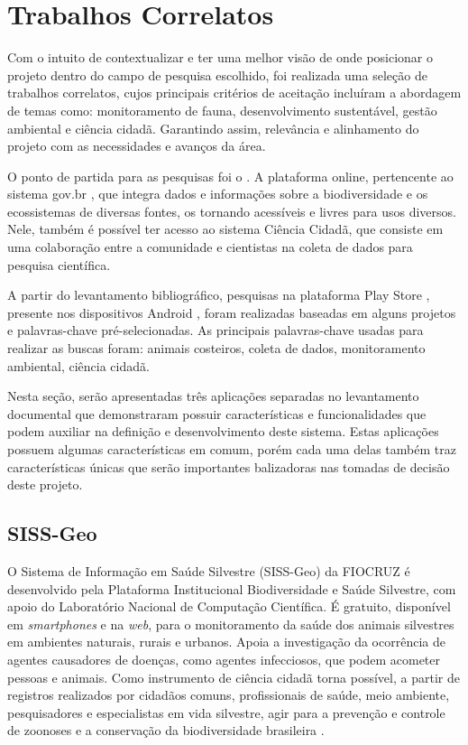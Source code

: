 \chapter{Trabalhos Correlatos}\label{trabalhos-correlatos}

Com o intuito de contextualizar e ter uma melhor visão de onde posicionar o projeto dentro do campo de pesquisa escolhido, foi realizada uma seleção de trabalhos correlatos, cujos principais critérios de aceitação incluíram a abordagem de temas como: monitoramento de fauna, desenvolvimento sustentável, gestão ambiental e ciência cidadã. Garantindo assim, relevância e alinhamento do projeto com as necessidades e avanços da área.

O ponto de partida para as pesquisas foi o . A plataforma online, pertencente ao sistema gov.br \cite{govbr2024}, que integra dados e informações sobre a biodiversidade e os ecossistemas de diversas fontes, os tornando acessíveis e livres para usos diversos. Nele, também é possível ter acesso ao sistema Ciência Cidadã, que consiste em uma colaboração entre a comunidade e cientistas na coleta de dados para pesquisa científica. 

A partir do levantamento bibliográfico, pesquisas na plataforma Play Store \cite{playstore2024}, presente nos dispositivos Android \cite{android2024}, foram realizadas baseadas em alguns projetos e palavras-chave pré-selecionadas. As principais palavras-chave usadas para realizar as buscas foram: animais costeiros, coleta de dados, monitoramento ambiental, ciência cidadã.

Nesta seção, serão apresentadas três aplicações separadas no levantamento documental que  demonstraram possuir características e funcionalidades que podem auxiliar na definição e desenvolvimento deste sistema. Estas aplicações possuem algumas características em comum, porém cada uma delas também traz características únicas que serão importantes balizadoras nas tomadas de decisão deste projeto.

\section{SISS-Geo}\label{siss-geo}

O Sistema de Informação em Saúde Silvestre (SISS-Geo) da FIOCRUZ é desenvolvido pela Plataforma Institucional Biodiversidade e Saúde Silvestre, com apoio do Laboratório Nacional de Computação Científica. É gratuito, disponível em \textit{smartphones} e na \textit{web}, para o monitoramento da saúde dos animais silvestres em ambientes naturais, rurais e urbanos. Apoia a investigação da ocorrência de agentes causadores de doenças, como agentes infecciosos, que podem acometer pessoas e animais. Como instrumento de ciência cidadã torna possível, a partir de registros realizados por cidadãos comuns, profissionais de saúde, meio ambiente, pesquisadores e especialistas em vida silvestre, agir para a prevenção e controle de zoonoses e a conservação da biodiversidade brasileira \cite{chame2015sissgeo}.


